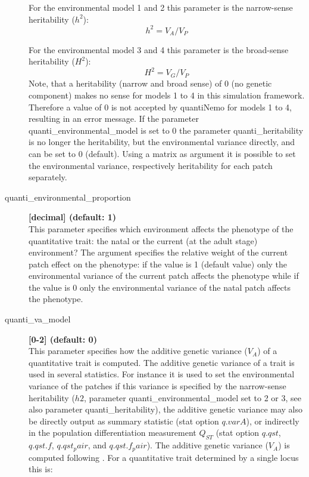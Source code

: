 \documentclass[letterpaper,12pt,oneside]{book}
\begin{document}
\begin{description}
For the environmental model 1 and 2 this parameter is the narrow-sense heritability ($h^{2}$):
    \[h^{2} = V_{A}/V_{P}\]
    
For the environmental model 3 and 4 this parameter is the broad-sense heritability ($H^{2}$):
    \[H^{2} = V_{G}/V_{P}\]
Note, that a heritability (narrow and broad sense) of 0 (no genetic component) makes no sense for models 1 to 4 in this simulation framework. Therefore a value of 0 is not accepted by quantiNemo for models 1 to 4, resulting in an error message. If the parameter \textsf{quanti\_environmental\_model} is set to 0 the parameter \textsf{quanti\_heritability} is no longer the heritability, but the environmental variance directly, and can be set to 0 (default). Using a matrix as argument it is possible to set the environmental variance, respectively heritability for each patch separately.

\item [quanti\_environmental\_proportion\index{quanti\_environmental\_proportion}] \textbf{[decimal] (default: 1)}\\
This parameter specifies which environment affects the phenotype of the quantitative trait: the natal or the current (at the adult stage) environment? The argument specifies the relative weight of the current patch effect on the phenotype: if the value is 1 (default value) only the environmental variance of the current patch affects the phenotype while if the value is 0 only the environmental variance of the natal patch affects the phenotype.

\item [quanti\_va\_model\index{quanti\_va\_model}] \textbf{[0-2] (default: 0)}\\
This parameter specifies how the additive genetic variance ($V_{A}$) of a quantitative trait is computed. The additive genetic variance of a trait is used in several statistics. For instance it is used to set the environmental variance of the patches if this variance is specified by the narrow-sense heritability ($h2$, parameter \textsf{quanti\_environmental\_model} set to 2 or 3, see also parameter \textsf{quanti\_heritability}), the additive genetic variance may also be directly output as summary statistic (stat option $q.varA$), or indirectly in the population differentiation measurement $Q_{ST}$ (stat option $q.qst$, $q.qst.f$, $q.qst_pair$, and $q.qst.f_pair$).
The additive genetic variance ($V_{A}$) is computed following \citet[p85-87]{Lynch_1998}. For a quantitative trait determined by a single locus this is:


\end{description}
\end{document}
